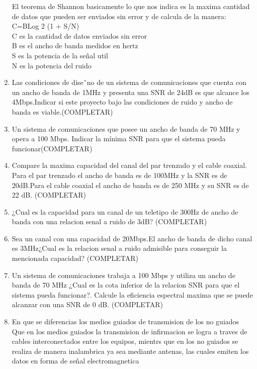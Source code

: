 \documentclass{udparticle}
\begin{document}
\begin{enumerate}
    El teorema de Shannon basicamente lo que nos indica es la maxima cantidad de datos que pueden ser enviados sin error y de calcula de la manera:\\
            C=BLog 2 (1 + S/N)\\
            C es la cantidad de datos enviados sin error\\
            B es el ancho de banda medidos en hertz\\
            S es la potencia de la señal util\\
            N es la potencia del ruido\\
    \item  Las condiciones de dise˜no de un sistema de comunicaciones que cuenta con un ancho de banda de 1MHz y presenta una SNR de 24dB es que alcance los 4Mbps.Indicar si este proyecto bajo las condiciones de ruido y ancho de banda es viable.(COMPLETAR) \\
    \item Un sistema de comunicaciones que posee un ancho de banda de 70 MHz y opera a 100 Mbps. Indicar la mínima SNR para que el sistema pueda funcionar(COMPLETAR) \\
    \item  Compare la maxima capacidad del canal del par trenzado y el cable coaxial.\\Para el par trenzado el ancho de banda es de 100MHz y la SNR es de 20dB.Para el cable coaxial el ancho de banda es de 250 MHz y su SNR es de 22 dB. (COMPLETAR)\\
    \item  ¿Cual es la capacidad para un canal de un teletipo de 300Hz de ancho de banda con una relacion senal a ruido de 3dB? (COMPLETAR)\\
    \item Sea un canal con una capacidad de 20Mbps.El ancho de banda de dicho canal es 3MHz¿Cual es la relacion senal a ruido admisible para conseguir la mencionada capacidad? (COMPLETAR)\\
    \item  Un sistema de comunicaciones trabaja a 100 Mbps y utiliza un ancho de banda de 70 MHz ¿Cual es la cota inferior de la relacion SNR para que el sistema pueda funcionar?. Calcule la eﬁciencia espectral maxima que se puede alcanzar con una SNR de 0 dB. (COMPLETAR)\\
    \item En que se diferencias los medios guiados de transmision de los no guiados\\
    Que en los medios guiados la transmision de infirmacion se logra a traves de cables interconectados entre los equipos, mientrs que en los no guiados se realiza de manera inalambrica ya sea mediante antenas, las cuales emiten los datos en forma de señal electromagnetica\\

\end{enumerate}
\end{document}
